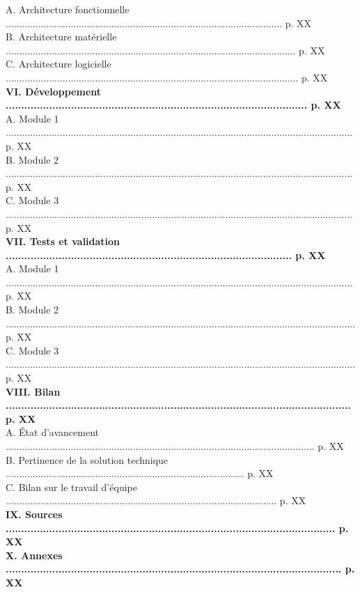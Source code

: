 \documentclass[a4paper,11pt]{book}
\begin{document}
\begin{tabbing}
A. Architecture fonctionnelle ...................................................................................................... p. XX\\
B. Architecture matérielle ........................................................................................................... p. XX\\
C. Architecture logicielle ............................................................................................................ p. XX\\
\textbf{{VI. Développement ................................................................................................. p. XX}}\\
A. Module 1 ................................................................................................................................ p. XX\\
B. Module 2 ................................................................................................................................ p. XX\\
C. Module 3 ................................................................................................................................ p. XX\\
\textbf{{VII. Tests et validation ............................................................................................ p. XX}}\\
A. Module 1 ................................................................................................................................ p. XX\\
B. Module 2 ................................................................................................................................. p. XX\\
C. Module 3 ................................................................................................................................. p. XX\\
\textbf{{VIII. Bilan ............................................................................................................... p. XX}}\\
A. État d'avancement .................................................................................................................. p. XX\\
B. Pertinence de la solution technique ........................................................................................ p. XX\\
C. Bilan sur le travail d'équipe .................................................................................................... p. XX\\
\textbf{{IX. Sources .......................................................................................................... p. XX}}\\
\textbf{{X. Annexes ............................................................................................................ p. XX}}\\
\end{tabbing}
\end{document}
